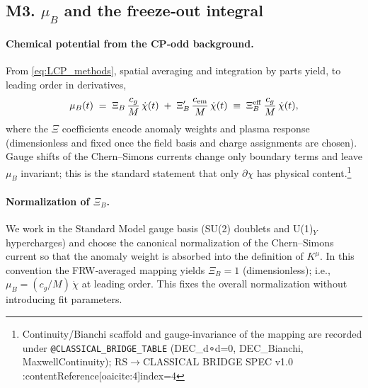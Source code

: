 \documentclass[11pt]{article}
\begin{document}
\bigskip

\subsection*{M3. \(\mu_B\) and the freeze‑out integral}

\paragraph{Chemical potential from the CP‑odd background.}
From \eqref{eq:LCP_methods}, spatial averaging and integration by parts yield, to leading order in derivatives,
\begin{equation}
  \mu_B(t) \;=\; \Xi_B\,\frac{c_g}{M}\,\dot\chi(t)\;+\;\Xi'_B\,\frac{c_{\rm em}}{M}\,\dot\chi(t)
  \;\equiv\; \Xi_B^{\rm eff}\,\frac{c_g}{M}\,\dot\chi(t),
  \label{eq:muB_methods}
\end{equation}
where the \(\Xi\) coefficients encode anomaly weights and plasma response (dimensionless and fixed once the field basis and charge assignments are chosen). Gauge shifts of the Chern–Simons currents change only boundary terms and leave \(\mu_B\) invariant; this is the standard statement that only \(\partial\chi\) has physical content.\footnote{Continuity/Bianchi scaffold and gauge‑invariance of the mapping are recorded under \texttt{@CLASSICAL\_BRIDGE\_TABLE} (DEC\_d∘d=0, DEC\_Bianchi, MaxwellContinuity); RS\(\to\)CLASSICAL BRIDGE SPEC v1.0 :contentReference[oaicite:4]{index=4}}

\paragraph{Normalization of \(\Xi_B\).}
We work in the Standard Model gauge basis (SU(2) doublets and U(1)$_Y$ hypercharges) and choose the canonical normalization of the Chern–Simons current so that the anomaly weight is absorbed into the definition of \(K^\mu\). In this convention the FRW‑averaged mapping yields \(\Xi_B=1\) (dimensionless); i.e., \(\mu_B=(c_g/M)\,\dot\chi\) at leading order. This fixes the overall normalization without introducing fit parameters.
\end{document}
